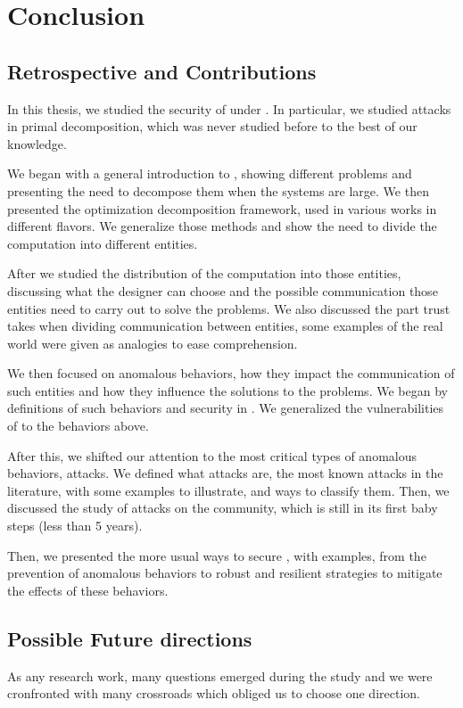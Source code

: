\documentclass[../main.tex]{subfiles}
\begin{document}
\chapter{Conclusion}\label{sec:conclusion}

\section{Retrospective and Contributions}
\label{sec:retr-contr}
In this thesis, we studied the security of \cps{} under \dmpc{}. In particular, we studied attacks in primal decomposition, which was never studied before to the best of our knowledge.

We began with a general introduction to \mpc{}, showing different \mpc{} problems and presenting the need to decompose them when the systems are large.
We then presented the optimization decomposition framework, used in various works in different flavors.
We generalize those methods and show the need to divide the computation into different entities.

After we studied the distribution of the computation into those entities, discussing what the designer can choose and the possible communication those entities need to carry out to solve the problems.
We also discussed the part trust takes when dividing communication between entities, some examples of the real world were given as analogies to ease comprehension.

We then focused on anomalous behaviors, how they impact the communication of such entities and how they influence the solutions to the problems.
We began by definitions of such behaviors and security in \cps{}.
We generalized the vulnerabilities of \cps{} to the behaviors above.

After this, we shifted our attention to the most critical types of anomalous behaviors, attacks.
We defined what attacks are, the most known attacks in the literature, with some examples to illustrate, and ways to classify them.
Then, we discussed the study of attacks on the \dmpc{} community, which is still
in its first baby steps (less than 5 years).

Then, we presented the more usual ways to secure \cps{}, with examples, from the prevention of anomalous behaviors to robust and resilient strategies to mitigate the effects of these behaviors.


\section{Possible Future directions}
As any research work, many questions emerged during the study and we were cronfronted with many crossroads which obliged us to choose one direction.
\end{document}
